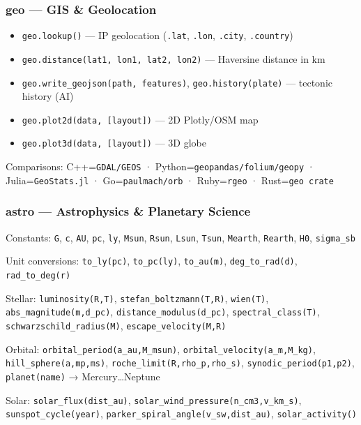 \documentclass[
]{article}
\providecommand{\tightlist}{%
  \setlength{\itemsep}{0pt}\setlength{\parskip}{0pt}}
\begin{document}
\subsubsection{geo --- GIS \& Geolocation}\label{geo-gis-geolocation}

\begin{itemize}
\tightlist
\item
  \texttt{geo.lookup()} --- IP geolocation (\texttt{.lat},
  \texttt{.lon}, \texttt{.city}, \texttt{.country})
\item
  \texttt{geo.distance(lat1,\ lon1,\ lat2,\ lon2)} --- Haversine
  distance in km
\item
  \texttt{geo.write\_geojson(path,\ features)},
  \texttt{geo.history(plate)} --- tectonic history (AI)
\item
  \texttt{geo.plot2d(data,\ {[}layout{]})} --- 2D Plotly/OSM map
\item
  \texttt{geo.plot3d(data,\ {[}layout{]})} --- 3D globe
\end{itemize}

Comparisons: C++=\texttt{GDAL/GEOS} ·
Python=\texttt{geopandas/folium/geopy} · Julia=\texttt{GeoStats.jl} ·
Go=\texttt{paulmach/orb} · Ruby=\texttt{rgeo} · Rust=\texttt{geo\ crate}

\subsubsection{astro --- Astrophysics \& Planetary
Science}\label{astro-astrophysics-planetary-science}

Constants: \texttt{G}, \texttt{c}, \texttt{AU}, \texttt{pc},
\texttt{ly}, \texttt{Msun}, \texttt{Rsun}, \texttt{Lsun}, \texttt{Tsun},
\texttt{Mearth}, \texttt{Rearth}, \texttt{H0}, \texttt{sigma\_sb}

Unit conversions: \texttt{to\_ly(pc)}, \texttt{to\_pc(ly)},
\texttt{to\_au(m)}, \texttt{deg\_to\_rad(d)}, \texttt{rad\_to\_deg(r)}

Stellar: \texttt{luminosity(R,T)}, \texttt{stefan\_boltzmann(T,R)},
\texttt{wien(T)}, \texttt{abs\_magnitude(m,d\_pc)},
\texttt{distance\_modulus(d\_pc)}, \texttt{spectral\_class(T)},
\texttt{schwarzschild\_radius(M)}, \texttt{escape\_velocity(M,R)}

Orbital: \texttt{orbital\_period(a\_au,M\_msun)},
\texttt{orbital\_velocity(a\_m,M\_kg)}, \texttt{hill\_sphere(a,mp,ms)},
\texttt{roche\_limit(R,rho\_p,rho\_s)}, \texttt{synodic\_period(p1,p2)},
\texttt{planet(name)} → Mercury\ldots Neptune

Solar: \texttt{solar\_flux(dist\_au)},
\texttt{solar\_wind\_pressure(n\_cm3,v\_km\_s)},
\texttt{sunspot\_cycle(year)},
\texttt{parker\_spiral\_angle(v\_sw,dist\_au)},
\texttt{solar\_activity()}
\end{document}

